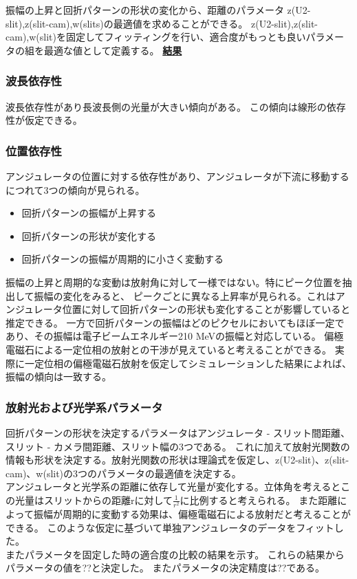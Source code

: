 \documentclass[a4paper,11pt,uplatex]{jsbook}
\begin{document}
振幅の上昇と回折パターンの形状の変化から、距離のパラメータ z(U2-slit),z(slit-cam),w(slits)の最適値を求めることができる。
z(U2-slit),z(slit-cam),w(slit)を固定してフィッティングを行い、適合度がもっとも良いパラメータの組を最適な値として定義する。
\noindent \textbf{\underline{結果}}\par

\subsubsection{波長依存性}
波長依存性があり長波長側の光量が大きい傾向がある。
この傾向は線形の依存性が仮定できる。\\
\subsubsection{位置依存性}
アンジュレータの位置に対する依存性があり、アンジュレータが下流に移動するにつれて3つの傾向が見られる。
\begin{itemize}
  \item 回折パターンの振幅が上昇する
  \item 回折パターンの形状が変化する
  \item 回折パターンの振幅が周期的に小さく変動する
\end{itemize}
振幅の上昇と周期的な変動は放射角に対して一様ではない。特にピーク位置を抽出して振幅の変化をみると、
ピークごとに異なる上昇率が見られる。これはアンジュレータ位置に対して回折パターンの形状も変化することが影響していると推定できる。
一方で回折パターンの振幅はどのピクセルにおいてもほぼ一定であり、その振幅は電子ビームエネルギー210 MeVの振幅と対応している。
偏極電磁石による一定位相の放射との干渉が見えていると考えることができる。
実際に一定位相の偏極電磁石放射を仮定してシミュレーションした結果によれば、振幅の傾向は一致する。\\
\subsubsection{放射光および光学系パラメータ}
回折パターンの形状を決定するパラメータはアンジュレータ - スリット間距離、スリット - カメラ間距離、スリット幅の3つである。
これに加えて放射光関数の情報も形状を決定する。放射光関数の形状は理論式を仮定し、z(U2-slit)、z(slit-cam)、w(slit)の3つのパラメータの最適値を決定する。\\
アンジュレータと光学系の距離に依存して光量が変化する。立体角を考えるとこの光量はスリットからの距離rに対して$\frac{1}{r^2}$に比例すると考えられる。
また距離によって振幅が周期的に変動する効果は、偏極電磁石による放射だと考えることができる。
このような仮定に基づいて単独アンジュレータのデータをフィットした。\\
またパラメータを固定した時の適合度の比較の結果を示す。
これらの結果からパラメータの値を??と決定した。
またパラメータの決定精度は??である。
\end{document}
